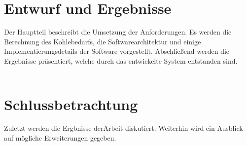 \documentclass{scrbook} %
\begin{document}
	\chapter{Entwurf und Ergebnisse}
	Der Hauptteil beschreibt die Umsetzung der Anforderungen. Es werden die Berechnung des Kohlebedarfs, die Softwarearchitektur und einige Implementierungsdetails der Software vorgestellt. Abschließend werden die Ergebnisse präsentiert, welche durch das entwickelte System entstanden sind.\\
	\\
	
	
	
	

	\chapter{Schlussbetrachtung}
	Zuletzt werden die Ergbnisse derArbeit diskutiert. Weiterhin wird ein Ausblick auf mögliche Erweiterungen gegeben.\\
	\\
	
	

	\ifisbook\cleardoubleemptypage\fi
	\printbibliography %

	\appendix %


	\ifisbook\pagestyle{plain}\cleardoubleemptypage\fi
\end{document}
